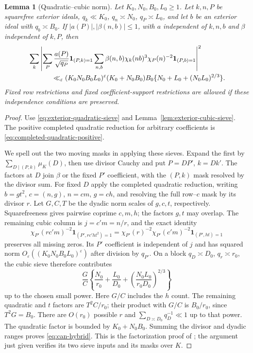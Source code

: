 \documentclass[11pt,a4paper]{article}
\numberwithin{equation}{section}
\newtheorem{lemma}[theorem]{Lemma}
\theoremstyle{definition}
\theoremstyle{remark}
\newcommand{\eps}{\varepsilon}
\begin{document}
\begin{lemma}[Quadratic--cubic norm]\label{lem:can-hybrid}
Let $K_0,N_0,B_0,L_0\ge1$.  Let $k,n,P$ be squarefree exterior ideals,
$q_k\ll K_0$, $q_n\asymp N_0$, $q_P\asymp L_0$, and let $b$ be an
exterior ideal with $q_b\asymp B_0$.  If $|a(P)|,|\beta(n,b)|\le1$,
with $a$ independent of $k,n,b$ and $\beta$ independent of $k,P$, then
\begin{align}\label{eq:can-hybrid}
 &\sum_k\left|
   \sum_P\frac{a(P)}{\sqrt{q_P}}\mathbf1_{(P,k)=1}
   \sum_{n,b}\beta(n,b)\chi_k(nb)^3\chi_P(n)^{-2}
                       \mathbf1_{(P,b)=1}\right|^2\notag\\
 &\hspace{12mm}\ll_{\eps}(K_0N_0B_0L_0)^\eps
       (K_0+N_0B_0)B_0
       \{N_0+L_0+(N_0L_0)^{2/3}\}.
\end{align}
Fixed row restrictions and fixed coefficient-support restrictions are
allowed if these independence conditions are preserved.
\end{lemma}
\begin{proof}
Use \eqref{eq:exterior-quadratic-sieve} and
Lemma~\ref{lem:exterior-cubic-sieve}.  The positive completed
quadratic reduction for arbitrary coefficients is
\eqref{eq:completed-quadratic-positive}.

We spell out the two moving masks in applying these sieves.
Expand the first by $\sum_{D\mid(P,k)}\mu_K(D)$, then use divisor
Cauchy and put $P=DP'$, $k=Dk'$.  The factors at $D$ join $\beta$ or the fixed $P'$ coefficient,
with the $(P,k)$ mask resolved by the divisor sum.
For fixed $D$ apply the completed quadratic reduction, writing
$b=gt^2$, $c=(n,g)$, $n=cm$, $g=ch$, and resolving the full row--$c$
mask by its divisor $r$.  Let $G,C,T$ be the dyadic norm scales of
$g,c,t$, respectively.  Squarefreeness gives pairwise coprime $c,m,h$; the factors $g,t$
may overlap.
The remaining cubic column is $j=c'm=n/r$, and the exact identity
\[
 \chi_{P'}(rc'm)^{-2}\mathbf1_{(P',rc'ht^2)=1}
 =\chi_{P'}(r)^{-2}\chi_{P'}(c'm)^{-2}
       \mathbf1_{(P',ht)=1}
\]
preserves all missing zeros.  Its $P'$ coefficient is independent of
$j$ and has squared norm $O_\eps((K_0N_0B_0L_0)^\eps)$ after division
by $q_{P'}$.  On a block $q_D\asymp D_0$, $q_r\asymp r_0$, the cubic
sieve therefore contributes
\[
 \frac GC\left\{\frac{N_0}{r_0}+\frac{L_0}{D_0}
       +\left(\frac{N_0L_0}{r_0D_0}\right)^{2/3}\right\}
\]
up to the chosen small power.  Here $G/C$ includes the $h$ count.
The remaining quadratic and $t$ factors are $T^2C/r_0$; their
product with $G/C$ is $B_0/r_0$, since $T^2G=B_0$.
There are $O(r_0)$ possible $r$
and $\sum_{D\asymp D_0}q_D^{-1}\ll1$ up to that power.
The quadratic factor is bounded by $K_0+N_0B_0$.
Summing the divisor and dyadic ranges proves \eqref{eq:can-hybrid}.
This is the factorization proof of \cite[Lemma 14.2]{Q}; the argument
just given verifies its two sieve inputs and its masks over $K$.
\end{proof}
\end{document}

